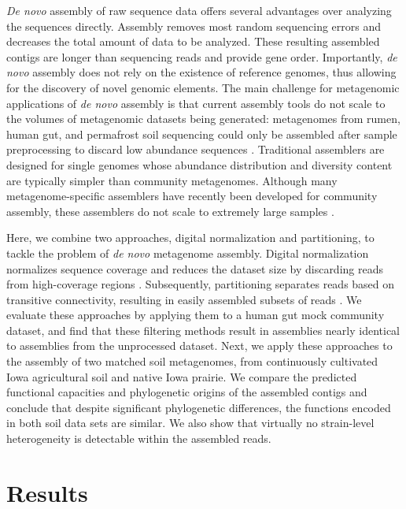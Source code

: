 \documentclass[11pt]{article} %
\begin{document}
\emph{De novo} assembly of raw sequence data offers several advantages
over analyzing the sequences directly.  Assembly removes most random
sequencing errors and decreases the total amount of data to be
analyzed.  These resulting assembled contigs are longer than
sequencing reads and provide gene order.  Importantly, \emph{de novo}
assembly does not rely on the existence of reference genomes, thus
allowing for the discovery of novel genomic elements.  The main challenge for
metagenomic applications of \emph{de novo} assembly is that current
assembly tools do not scale to the volumes of metagenomic datasets
being generated: metagenomes from rumen, human gut, and permafrost
soil sequencing could only be assembled after sample preprocessing to
discard low abundance sequences
\cite{Hess:2011p686,Mackelprang:2011p1087,Qin:2010p189}.  Traditional
assemblers are designed for single genomes whose abundance
distribution and diversity content are typically simpler than
community metagenomes.  Although many metagenome-specific assemblers
have recently been developed for community assembly, these assemblers
do not scale to extremely large samples \cite{Scholz:2012p1372}.

Here, we combine two approaches, digital normalization and
partitioning, to tackle the problem of {\em de novo} metagenome
assembly.  Digital normalization normalizes sequence coverage and
reduces the dataset size by discarding reads from high-coverage
regions \cite{browndiginorm}.  Subsequently, partitioning separates
reads based on transitive connectivity, resulting in easily assembled
subsets of reads \cite{howeartifacts,Pell:2012cq}.  We evaluate these
approaches by applying them to a human gut mock community dataset, and
find that these filtering methods result in assemblies nearly
identical to assemblies from the unprocessed dataset.  Next, we apply
these approaches to the assembly of two matched soil metagenomes, from
continuously cultivated Iowa agricultural soil and native Iowa
prairie.  We compare the predicted functional capacities and
phylogenetic origins of the assembled contigs and conclude that
despite significant phylogenetic differences, the functions encoded in
both soil data sets are similar.  We also show that virtually no
strain-level heterogeneity is detectable within the assembled reads.

\section{Results}
\end{document}
